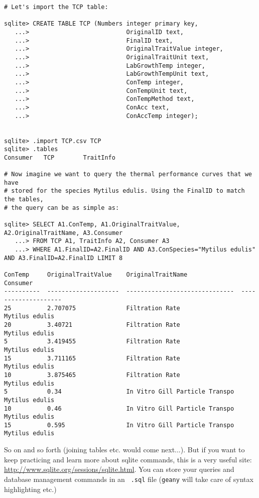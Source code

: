 \begin{lstlisting}
# Let's import the TCP table:

sqlite> CREATE TABLE TCP (Numbers integer primary key,
   ...>                           OriginalID text,
   ...>                           FinalID text,
   ...>                           OriginalTraitValue integer,
   ...>                           OriginalTraitUnit text,
   ...>                           LabGrowthTemp integer,
   ...>                           LabGrowthTempUnit text,   
   ...>                           ConTemp integer,
   ...>                           ConTempUnit text,
   ...>                           ConTempMethod text,
   ...>                           ConAcc text,
   ...>                           ConAccTemp integer);


sqlite> .import TCP.csv TCP
sqlite> .tables
Consumer   TCP        TraitInfo
                          
# Now imagine we want to query the thermal performance curves that we have
# stored for the species Mytilus edulis. Using the FinalID to match the tables,
# the query can be as simple as:

sqlite> SELECT A1.ConTemp, A1.OriginalTraitValue, A2.OriginalTraitName, A3.Consumer
   ...> FROM TCP A1, TraitInfo A2, Consumer A3
   ...> WHERE A1.FinalID=A2.FinalID AND A3.ConSpecies="Mytilus edulis" AND A3.FinalID=A2.FinalID LIMIT 8

ConTemp     OriginalTraitValue    OriginalTraitName               Consumer            
----------  --------------------  ------------------------------  --------------------
25          2.707075              Filtration Rate                 Mytilus edulis      
20          3.40721               Filtration Rate                 Mytilus edulis      
5           3.419455              Filtration Rate                 Mytilus edulis      
15          3.711165              Filtration Rate                 Mytilus edulis      
10          3.875465              Filtration Rate                 Mytilus edulis      
5           0.34                  In Vitro Gill Particle Transpo  Mytilus edulis      
10          0.46                  In Vitro Gill Particle Transpo  Mytilus edulis      
15          0.595                 In Vitro Gill Particle Transpo  Mytilus edulis

 \end{lstlisting}                          

So on and so forth (joining tables etc. would come next...). But if you 
want to keep practicing and learn more about sqlite commands, this is a 
very useful site: \url{http://www.sqlite.org/sessions/sqlite.html}. You 
can store your queries and database management commands in an {\tt 
.sql} file ({\tt geany} will take care of syntax highlighting etc.)

